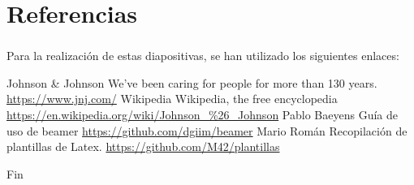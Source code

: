 \documentclass[compress, aspectratio=169]{beamer} %
\begin{document}
\section{Referencias}
	\begin{frame}
	\transdissolve[duration=1]

		\frametitle{\insertsection}
		
		Para la realización de estas diapositivas, se han utilizado los siguientes enlaces:
		
		\footnotesize{
		\begin{thebibliography}{7} %
			 Johnson \& Johnson
				\newblock We've been caring for people for more than 130 years.
				\newblock \url{https://www.jnj.com/}
			 Wikipedia
				\newblock Wikipedia, the free encyclopedia
				\newblock \url{https://en.wikipedia.org/wiki/Johnson\_\%26\_Johnson}
			 Pablo Baeyens
				\newblock Guía de uso de beamer
				\newblock \url{https://github.com/dgiim/beamer}
			 Mario Román
				\newblock Recopilación de plantillas de Latex.
				\newblock \url{https://github.com/M42/plantillas}
		\end{thebibliography}
		}
	\end{frame}


\begin{frame}
	\transdissolve[duration=1]

\Huge{\centerline{Fin}}
\end{frame}

\end{document}
